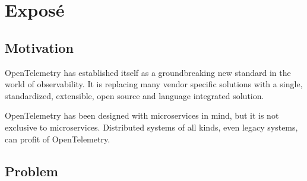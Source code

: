 \chapter{Exposé}

\section{Motivation}




OpenTelemetry has established itself as a groundbreaking new standard in the world of observability.
It is replacing many vendor specific solutions with a single, standardized, extensible, open source
and language integrated solution.

OpenTelemetry has been designed with microservices in mind, but it is not exclusive to microservices.
Distributed systems of all kinds, even legacy systems, can profit of OpenTelemetry. 

\section{Problem}



